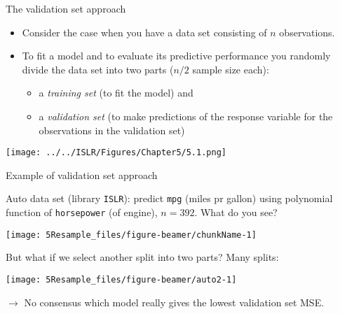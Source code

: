 \documentclass[10pt,ignorenonframetext,]{beamer}
\providecommand{\tightlist}{%
  \setlength{\itemsep}{0pt}\setlength{\parskip}{0pt}}
\begin{document}
\begin{frame}

\begin{block}{The validation set approach}

\vspace{2mm}

\begin{itemize}
\item
  Consider the case when you have a data set consisting of \(n\)
  observations.
\item
  To fit a model and to evaluate its predictive performance you randomly
  divide the data set into two parts (\(n/2\) sample size each):

  \begin{itemize}
  \tightlist
  \item
    a \emph{training set} (to fit the model) and
  \item
    a \emph{validation set} (to make predictions of the response
    variable for the observations in the validation set)
  \end{itemize}
\end{itemize}

\vspace{4mm}

\texttt{[image: ../../ISLR/Figures/Chapter5/5.1.png]}

\end{block}

\end{frame}

\begin{frame}[fragile]

\begin{block}{Example of validation set approach}

\vspace{2mm}

Auto data set (library \texttt{ISLR}): predict \texttt{mpg} (miles pr
gallon) using polynomial function of \texttt{horsepower} (of engine),
\(n=392\). What do you see?

\begin{center}\texttt{[image: 5Resample\_files/figure-beamer/chunkName-1]} \end{center}

\end{block}

\end{frame}

\begin{frame}

But what if we select another split into two parts? Many splits:

\begin{center}\texttt{[image: 5Resample\_files/figure-beamer/auto2-1]} \end{center}

\vspace{2mm}

\(\rightarrow\) No consensus which model really gives the lowest
validation set MSE.

\end{frame}
\end{document}
